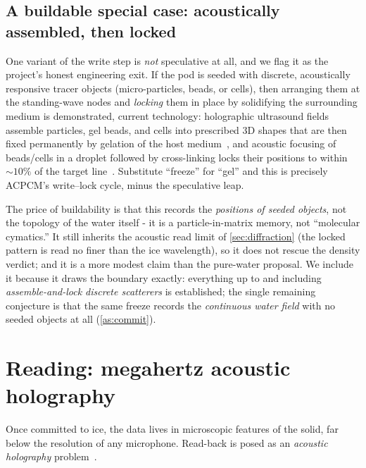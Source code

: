 \documentclass[11pt]{article}
\theoremstyle{definition}
\begin{document}
\subsection{A buildable special case: acoustically assembled, then locked}
\label{sec:assembly}
One variant of the write step is \emph{not} speculative at all, and we flag it as the
project's honest engineering exit. If the pod is seeded with discrete, acoustically
responsive tracer objects (micro-particles, beads, or cells), then arranging them at the
standing-wave nodes and \emph{locking} them in place by solidifying the surrounding medium
is demonstrated, current technology: holographic ultrasound fields assemble particles, gel
beads, and cells into prescribed 3D shapes that are then fixed permanently by gelation of the
host medium~\cite{melde2023assembly}, and acoustic focusing of beads/cells in a droplet
followed by cross-linking locks their positions to within ${\sim}10\%$ of the target
line~\cite{olofsson2021hydrogel}. Substitute ``freeze'' for ``gel'' and this is precisely
ACPCM's write--lock cycle, minus the speculative leap.

The price of buildability is that this records the \emph{positions of seeded objects}, not
the topology of the water itself - it is a particle-in-matrix memory, not ``molecular
cymatics.'' It still inherits the acoustic read limit of \cref{sec:diffraction} (the locked
pattern is read no finer than the ice wavelength), so it does not rescue the density verdict;
and it is a more modest claim than the pure-water proposal. We include it because it draws
the boundary exactly: everything up to and including \emph{assemble-and-lock discrete
scatterers} is established; the single remaining conjecture is that the same freeze records
the \emph{continuous water field} with no seeded objects at all (\cref{as:commit}).

\section{Reading: megahertz acoustic holography}
\label{sec:read}

Once committed to ice, the data lives in microscopic features of the solid, far below the
resolution of any microphone. Read-back is posed as an \emph{acoustic holography}
problem~\cite{melde2016holograms}.
\end{document}

